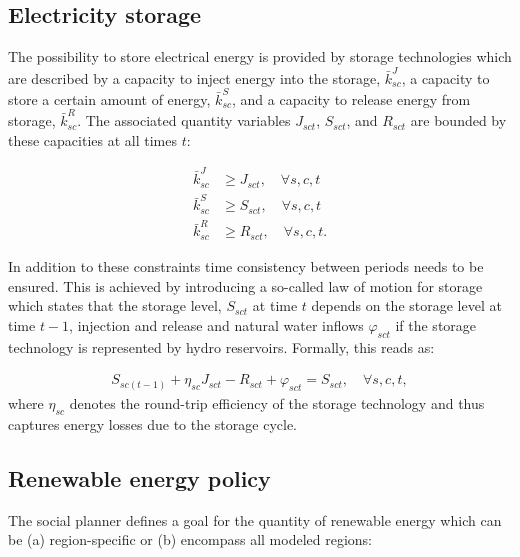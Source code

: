 \documentclass[authoryear]{elsarticle}
\begin{document}

\subsection{Electricity storage}

The possibility to store electrical energy is provided by storage technologies which are described by a capacity to inject energy into the storage, $\bar{k}^J_{sc}$, a capacity to store a certain amount of energy, $\bar{k}^S_{sc}$, and a capacity to release energy from storage, $\bar{k}^R_{sc}$. The associated quantity variables $J_{sct}$, $S_{sct}$, and $R_{sct}$ are bounded by these capacities at all times $t$:

\begin{align}
\bar{k}^J_{sc} &\geq J_{sct}, \quad \forall s,c,t \label{eq:mkt_capj}\\
\bar{k}^S_{sc} &\geq S_{sct}, \quad \forall s,c,t \label{eq:mkt_caps}\\
\bar{k}^R_{sc} &\geq R_{sct}, \quad \forall s,c,t.\label{eq:mkt_capr}
\end{align}

In addition to these constraints time consistency between periods needs to be ensured. This is achieved by introducing a so-called law of motion for storage which states that the storage level, $S_{sct}$ at time $t$ depends on the storage level at time $t-1$, injection and release and natural water inflows $\varphi_{sct}$ if the storage technology is represented by hydro reservoirs. Formally, this reads as:

\begin{align}
S_{sc(t-1)} + \eta_{sc} J_{sct} - R_{sct} + \varphi_{sct} = S_{sct}, \quad \forall s,c,t, \label{eq:mkt_lomstor}
\end{align}
where $\eta_{sc}$ denotes the round-trip efficiency of the storage technology and thus captures energy losses due to the storage cycle.

\subsection{Renewable energy policy}

The social planner defines a goal for the quantity of renewable energy which can be (a) region-specific or (b) encompass all modeled regions: 
\end{document}
